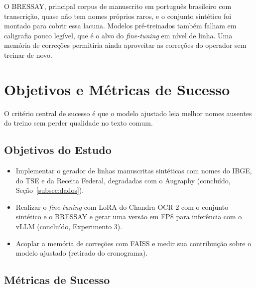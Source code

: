 \documentclass[12pt,a4paper]{article}
\begin{document}
O BRESSAY, principal corpus de manuscrito em português brasileiro com transcrição, quase não tem nomes próprios raros, e o conjunto sintético foi montado para cobrir essa lacuna. Modelos pré-treinados também falham em caligrafia pouco legível, que é o alvo do \emph{fine-tuning} em nível de linha. Uma memória de correções permitiria ainda aproveitar as correções do operador sem treinar de novo.

\section{Objetivos e Métricas de Sucesso}
\label{sec:objetivos}

O critério central de sucesso é que o modelo ajustado leia melhor nomes ausentes do treino sem perder qualidade no texto comum.

\subsection{Objetivos do Estudo}

\begin{itemize}
    \item Implementar o gerador de linhas manuscritas sintéticas com nomes do IBGE, do TSE e da Receita Federal, degradadas com o Augraphy (concluído, Seção~\ref{subsec:dados}).
    \item Realizar o \emph{fine-tuning} com LoRA do Chandra OCR 2 com o conjunto sintético e o BRESSAY e gerar uma versão em FP8 para inferência com o vLLM (concluído, Experimento 3).
    \item Acoplar a memória de correções com FAISS e medir sua contribuição sobre o modelo ajustado (retirado do cronograma).
\end{itemize}

\subsection{Métricas de Sucesso}
\end{document}
